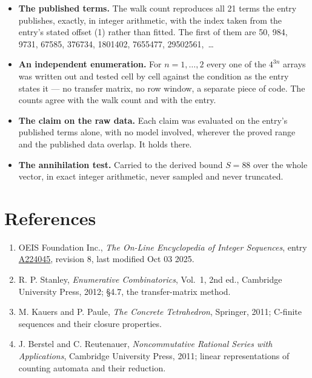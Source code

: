 \documentclass[11pt]{article}
\theoremstyle{definition}
\begin{document}
\begin{itemize}

\item {\bfseries The published terms.} The walk count reproduces all 21 terms the entry publishes, exactly, in integer arithmetic, with the index taken from the entry's stated offset (1) rather than fitted. The first of them are 50, 984, 9731, 67585, 376734, 1801402, 7655477, 29502561,~\dots

\item {\bfseries An independent enumeration.} For $n = 1,\dots,2$ every one of the $4^{3n}$ arrays was written out and tested cell by cell against the condition as the entry states it --- no transfer matrix, no row window, a separate piece of code. The counts agree with the walk count and with the entry.

\item {\bfseries The claim on the raw data.} Each claim was evaluated on the entry's published terms alone, with no model involved, wherever the proved range and the published data overlap. It holds there.

\item {\bfseries The annihilation test.} Carried to the derived bound $S = 88$ over the whole vector, in exact integer arithmetic, never sampled and never truncated.

\end{itemize}

\section{References}

\begin{enumerate}

\item OEIS Foundation Inc., \emph{The On-Line Encyclopedia of Integer Sequences}, entry \href{https://oeis.org/A224045}{A224045}, revision 8, last modified Oct 03 2025.

\item R. P. Stanley, \emph{Enumerative Combinatorics}, Vol.~1, 2nd ed., Cambridge University Press, 2012; \S4.7, the transfer-matrix method.

\item M. Kauers and P. Paule, \emph{The Concrete Tetrahedron}, Springer, 2011; C-finite sequences and their closure properties.

\item J. Berstel and C. Reutenauer, \emph{Noncommutative Rational Series with Applications}, Cambridge University Press, 2011; linear representations of counting automata and their reduction.

\end{enumerate}
\end{document}
